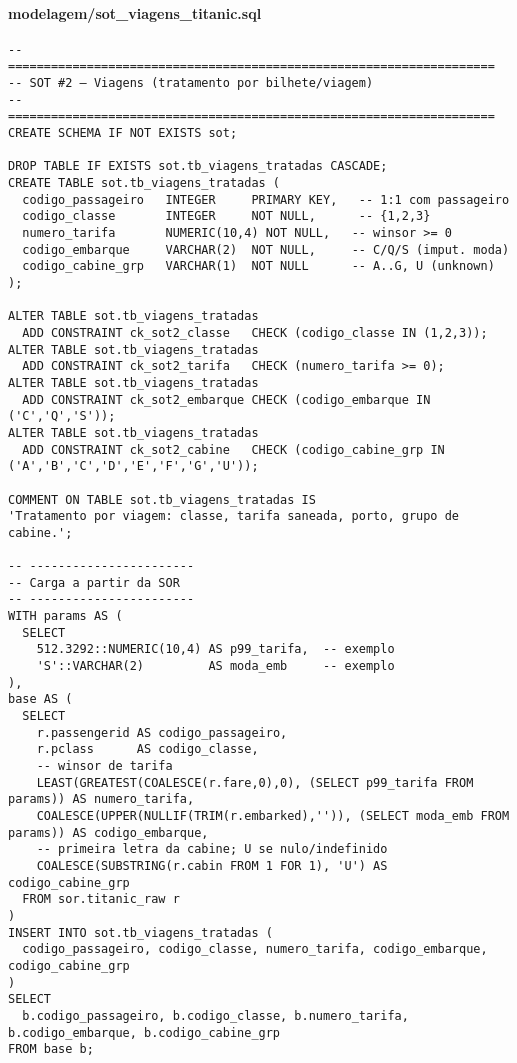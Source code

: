 \documentclass[12pt,a4paper]{article}
\begin{document}
\paragraph{modelagem/sot\_viagens\_titanic.sql}
\begin{verbatim}
-- ====================================================================
-- SOT #2 — Viagens (tratamento por bilhete/viagem)
-- ====================================================================
CREATE SCHEMA IF NOT EXISTS sot;

DROP TABLE IF EXISTS sot.tb_viagens_tratadas CASCADE;
CREATE TABLE sot.tb_viagens_tratadas (
  codigo_passageiro   INTEGER     PRIMARY KEY,   -- 1:1 com passageiro
  codigo_classe       INTEGER     NOT NULL,      -- {1,2,3}
  numero_tarifa       NUMERIC(10,4) NOT NULL,   -- winsor >= 0
  codigo_embarque     VARCHAR(2)  NOT NULL,     -- C/Q/S (imput. moda)
  codigo_cabine_grp   VARCHAR(1)  NOT NULL      -- A..G, U (unknown)
);

ALTER TABLE sot.tb_viagens_tratadas
  ADD CONSTRAINT ck_sot2_classe   CHECK (codigo_classe IN (1,2,3));
ALTER TABLE sot.tb_viagens_tratadas
  ADD CONSTRAINT ck_sot2_tarifa   CHECK (numero_tarifa >= 0);
ALTER TABLE sot.tb_viagens_tratadas
  ADD CONSTRAINT ck_sot2_embarque CHECK (codigo_embarque IN ('C','Q','S'));
ALTER TABLE sot.tb_viagens_tratadas
  ADD CONSTRAINT ck_sot2_cabine   CHECK (codigo_cabine_grp IN ('A','B','C','D','E','F','G','U'));

COMMENT ON TABLE sot.tb_viagens_tratadas IS
'Tratamento por viagem: classe, tarifa saneada, porto, grupo de cabine.';

-- -----------------------
-- Carga a partir da SOR
-- -----------------------
WITH params AS (
  SELECT
    512.3292::NUMERIC(10,4) AS p99_tarifa,  -- exemplo
    'S'::VARCHAR(2)         AS moda_emb     -- exemplo
),
base AS (
  SELECT
    r.passengerid AS codigo_passageiro,
    r.pclass      AS codigo_classe,
    -- winsor de tarifa
    LEAST(GREATEST(COALESCE(r.fare,0),0), (SELECT p99_tarifa FROM params)) AS numero_tarifa,
    COALESCE(UPPER(NULLIF(TRIM(r.embarked),'')), (SELECT moda_emb FROM params)) AS codigo_embarque,
    -- primeira letra da cabine; U se nulo/indefinido
    COALESCE(SUBSTRING(r.cabin FROM 1 FOR 1), 'U') AS codigo_cabine_grp
  FROM sor.titanic_raw r
)
INSERT INTO sot.tb_viagens_tratadas (
  codigo_passageiro, codigo_classe, numero_tarifa, codigo_embarque, codigo_cabine_grp
)
SELECT
  b.codigo_passageiro, b.codigo_classe, b.numero_tarifa, b.codigo_embarque, b.codigo_cabine_grp
FROM base b;
\end{verbatim}
\end{document}
